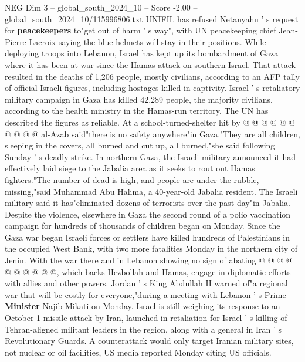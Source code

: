 \begin{textsample}{NEG Dim 3 – global\_south\_2024\_10 – Score -2.00 – global\_south\_2024\_10/115996806.txt}
UNIFIL has refused Netanyahu ' s request for \textbf{peacekeepers} to"get out of harm ' s way", with UN peacekeeping chief Jean-Pierre Lacroix saying the blue helmets will stay in their positions.
While deploying troops into Lebanon, Israel has kept up its bombardment of Gaza where it has been at war since the Hamas attack on southern Israel.
That attack resulted in the deaths of 1,206 people, mostly civilians, according to an AFP tally of official Israeli figures, including hostages killed in captivity.
Israel ' s retaliatory military campaign in Gaza has killed 42,289 people, the majority civilians, according to the health ministry in the Hamas-run territory.
The UN has described the figures as reliable.
At a school-turned-shelter hit by @ @ @ @ @ @ @ @ @ @ al-Azab said"there is no safety anywhere"in Gaza."They are all children, sleeping in the covers, all burned and cut up, all burned,"she said following Sunday ' s deadly strike.
In northern Gaza, the Israeli military announced it had effectively laid siege to the Jabalia area as it seeks to rout out Hamas fighters."The number of dead is high, and people are under the rubble, missing,"said Muhammad Abu Halima, a 40-year-old Jabalia resident.
The Israeli military said it has"eliminated dozens of terrorists over the past day"in Jabalia.
Despite the violence, elsewhere in Gaza the second round of a polio vaccination campaign for hundreds of thousands of children began on Monday.
Since the Gaza war began Israeli forces or settlers have killed hundreds of Palestinians in the occupied West Bank, with two more fatalities Monday in the northern city of Jenin.
With the war there and in Lebanon showing no sign of abating @ @ @ @ @ @ @ @ @ @, which backs Hezbollah and Hamas, engage in diplomatic efforts with allies and other powers.
Jordan ' s King Abdullah II warned of"a regional war that will be costly for everyone,"during a meeting with Lebanon ' s Prime \textbf{Minister} Najib Mikati on Monday.
Israel is still weighing its response to an October 1 missile attack by Iran, launched in retaliation for Israel ' s killing of Tehran-aligned militant leaders in the region, along with a general in Iran ' s Revolutionary Guards.
A counterattack would only target Iranian military sites, not nuclear or oil facilities, US media reported Monday citing US officials.

\end{textsample}
